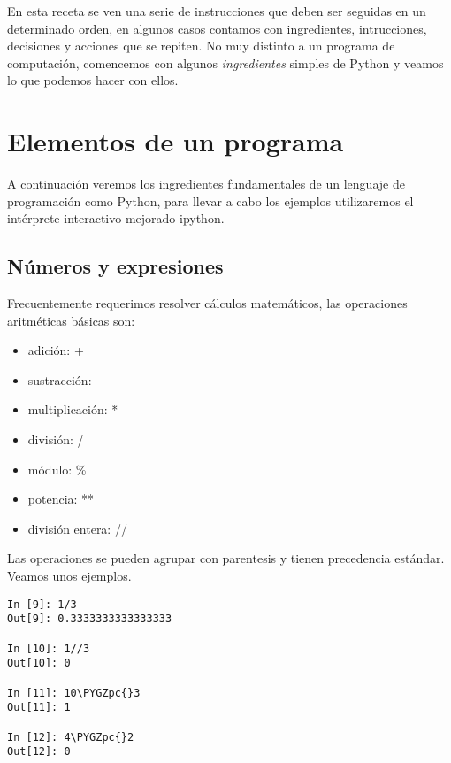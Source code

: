 \documentclass[a4paper,12pt,spanish]{sphinxmanual}
\def\PYGZpc{\char`\%}
\begin{document}
En esta receta se ven una serie de instrucciones que deben ser seguidas
en un determinado orden, en algunos casos contamos con ingredientes,
intrucciones, decisiones y acciones que se repiten. No muy distinto a un
programa de computación, comencemos con algunos \emph{ingredientes} simples
de Python y veamos lo que podemos hacer con ellos.


\section{Elementos de un programa}
\label{Unidad01:elementos-de-un-programa}
A continuación veremos los ingredientes fundamentales de un lenguaje de
programación como Python, para llevar a cabo los ejemplos utilizaremos
el intérprete interactivo mejorado ipython.


\subsection{Números y expresiones}
\label{Unidad01:numeros-y-expresiones}
Frecuentemente requerimos resolver cálculos matemáticos, las operaciones
aritméticas básicas son:
\begin{itemize}
\item {} 
adición: +

\item {} 
sustracción: -

\item {} 
multiplicación: *

\item {} 
división: /

\item {} 
módulo: \%

\item {} 
potencia: **

\item {} 
división entera: //

\end{itemize}

Las operaciones se pueden agrupar con parentesis y tienen precedencia
estándar. Veamos unos ejemplos.

\begin{Verbatim}[commandchars=\\\{\}]
In [9]: 1/3
Out[9]: 0.3333333333333333

In [10]: 1//3
Out[10]: 0

In [11]: 10\PYGZpc{}3
Out[11]: 1

In [12]: 4\PYGZpc{}2
Out[12]: 0
\end{Verbatim}
\end{document}
